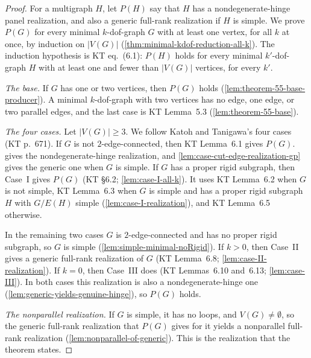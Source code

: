 \begin{proof}
  \leanok
  For a multigraph $H$, let $P(H)$ say that $H$ has a nondegenerate-hinge
  panel realization, and also a generic full-rank realization if $H$ is
  simple. We prove $P(G)$ for every minimal $k$-dof-graph $G$ with at
  least one vertex, for all $k$ at once, by induction on $|V(G)|$
  (\cref{thm:minimal-kdof-reduction-all-k}). The induction hypothesis is
  KT eq.~(6.1): $P(H)$ holds for every minimal $k'$-dof-graph $H$ with
  at least one and fewer than $|V(G)|$ vertices, for every $k'$.

  \emph{The base.} If $G$ has one or two vertices, then $P(G)$ holds
  (\cref{lem:theorem-55-base-producer}). A minimal $k$-dof-graph with
  two vertices has no edge, one edge, or two parallel edges, and the last
  case is KT Lemma~5.3 (\cref{lem:theorem-55-base}).

  \emph{The four cases.} Let $|V(G)| \ge 3$. We follow Katoh and
  Tanigawa's four cases (KT p.~671). If $G$ is not $2$-edge-connected,
  then KT Lemma~6.1 gives $P(G)$. 
  gives the nondegenerate-hinge realization, and
  \cref{lem:case-cut-edge-realization-gp} gives the generic one when $G$
  is simple. If $G$ has a proper rigid subgraph, then Case~I gives $P(G)$
  (KT \S6.2; \cref{lem:case-I-all-k}). It uses KT Lemma~6.2 when $G$ is
  not simple, KT Lemma~6.3 when $G$ is simple and has a proper rigid
  subgraph $H$ with $G/E(H)$ simple (\cref{lem:case-I-realization}), and
  KT Lemma~6.5 otherwise.

  In the remaining two cases $G$ is $2$-edge-connected and has no proper
  rigid subgraph, so $G$ is simple (\cref{lem:simple-minimal-noRigid}).
  If $k > 0$, then Case~II gives a generic full-rank realization of $G$
  (KT Lemma~6.8; \cref{lem:case-II-realization}). If $k = 0$, then
  Case~III does (KT Lemmas~6.10 and~6.13; \cref{lem:case-III}). In both
  cases this realization is also a nondegenerate-hinge one
  (\cref{lem:generic-yields-genuine-hinge}), so $P(G)$ holds.

  \emph{The nonparallel realization.} If $G$ is simple, it has no loops,
  and $V(G) \neq \emptyset$, so the generic full-rank realization that
  $P(G)$ gives for it yields a nonparallel full-rank realization
  (\cref{lem:nonparallel-of-generic}). This is the realization that the
  theorem states.


\end{proof}
